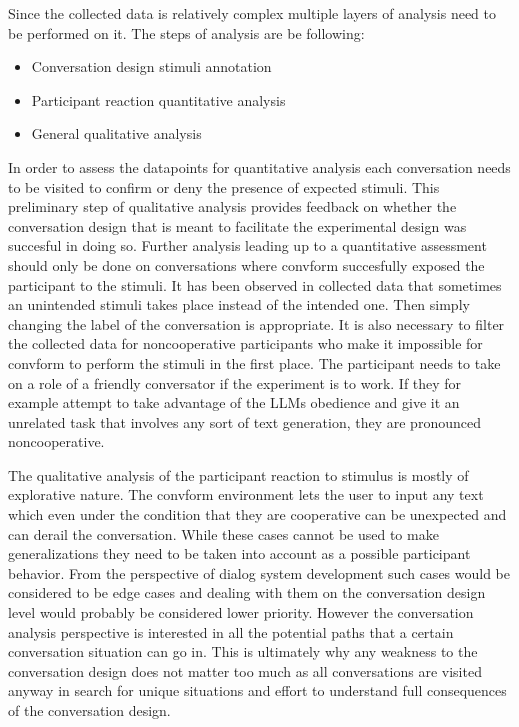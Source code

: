 \documentclass[12pt]{report}
\begin{document}
{Since the collected data is relatively complex
multiple layers of analysis need to be performed on it.
The steps of analysis are be following:

\begin{itemize}
\item{Conversation design stimuli annotation}
\item{Participant reaction quantitative analysis}
\item{General qualitative analysis}
\end{itemize}

In order to assess the datapoints for quantitative analysis
each conversation needs to be visited
to confirm or deny the presence of expected stimuli.
This preliminary step of qualitative analysis
provides feedback on whether the conversation design
that is meant to facilitate the experimental design
was succesful in doing so.
Further analysis leading up to a quantitative assessment
should only be done on conversations
where convform succesfully exposed the participant to the stimuli.
It has been observed in collected data
that sometimes an unintended stimuli
takes place instead of the intended one.
Then simply changing the label of the conversation is appropriate.
It is also necessary to filter the collected data for
noncooperative participants who make it impossible for convform
to perform the stimuli in the first place.
The participant needs to take on a role of a friendly conversator
if the experiment is to work.
If they for example attempt to take advantage of the LLMs obedience
and give it an unrelated task that involves any sort of text generation,
they are pronounced noncooperative.

The qualitative analysis of the participant reaction to stimulus
is mostly of explorative nature.
The convform environment lets the user to input any text
which even under the condition that they are cooperative
can be unexpected and can derail the conversation.
While these cases cannot be used to make generalizations
they need to be taken into account
as a possible participant behavior.
From the perspective of dialog system development
such cases would be considered to be edge cases
and dealing with them on the conversation design level
would probably be considered lower priority.
However the conversation analysis perspective
is interested in all the potential paths that
a certain conversation situation can go in.
This is ultimately why any weakness to the conversation design
does not matter too much
as all conversations are visited anyway
in search for unique situations and effort to understand full consequences of the conversation design.

}
\end{document}
